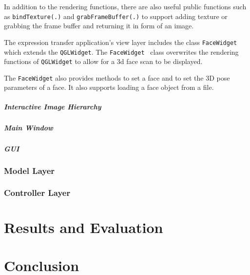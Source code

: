 \documentclass[11pt,a4paper]{report}
\begin{document}
In addition to the rendering functions, there are also useful public functions
such as \texttt{bindTexture(.)} and \texttt{grabFrameBuffer(.)} to support
adding texture or grabbing the frame buffer and returning it in form of an
image.

The expression transfer application's view layer includes the class
\texttt{FaceWidget} which extends the \texttt{QGLWidget}. The \texttt{FaceWidget
} class overwrites the rendering functions of \texttt{QGLWidget} to allow for a
3d face scan to be displayed.

The \texttt{FaceWidget} also provides methods to set a face and to set the 3D
pose parameters of a face. It also supports loading a face object from a file.
\paragraph{Interactive Image Hierarchy}

\paragraph{Main Window}

\paragraph{GUI}

\subsection{Model Layer}
\subsection{Controller Layer}


\chapter{Results and Evaluation}

\chapter{Conclusion}




\end{document}

